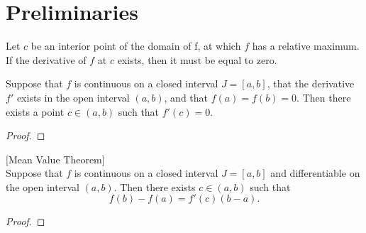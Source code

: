 \section{Preliminaries} %








\begin{theorem}
    Let $c$ be an interior point of the domain of f, at which $f$ has a relative 
    maximum. If the derivative of $f$ at $c$ exists, then it must be equal to zero.
    
\end{theorem}
\begin{theorem}{\cite[Thm. 19.5, p.~209]{bartle1982elements}}
    Suppose that $f$ is continuous on a closed interval $J = [a,b]$, that the 
    derivative $f'$ exists in the open interval $(a,b)$, and that 
    $f(a) = f(b) = 0$. Then there exists a point $c \in (a,b)$ such that 
    $f'(c) = 0$.
\end{theorem}
\begin{proof}

\end{proof}
\begin{theorem}\cite[Thm. 19.6, p.~210]{bartle1982elements}[Mean Value Theorem] \\
	Suppose that $f$ is continuous on a closed interval $J = [a,b]$ and 
	differentiable on the open interval $(a,b)$. Then there exists $c \in (a,b)$ 
	such that 
	$$
	    f(b) - f(a) = f'(c)(b - a).
	$$
\end{theorem}
\begin{proof}

\end{proof}


